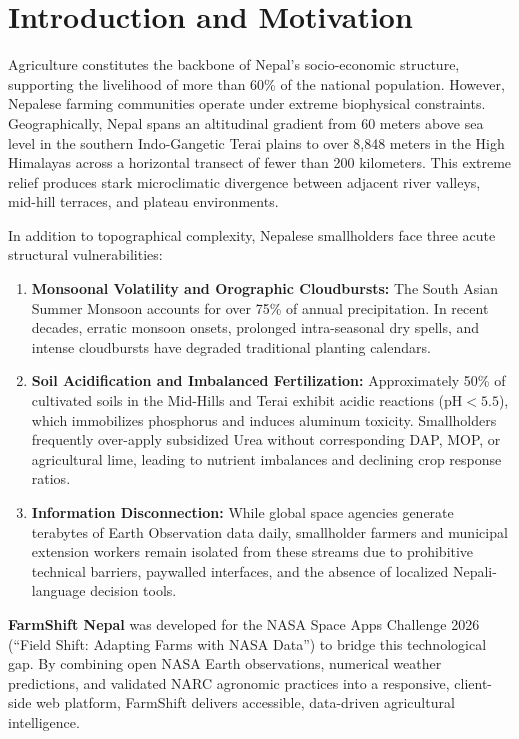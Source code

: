 \documentclass[11pt,a4paper]{report}
\begin{document}
\clearpage
{}

\chapter{Introduction and Motivation}

Agriculture constitutes the backbone of Nepal's socio-economic structure, supporting the livelihood of more than 60\% of the national population. However, Nepalese farming communities operate under extreme biophysical constraints. Geographically, Nepal spans an altitudinal gradient from 60 meters above sea level in the southern Indo-Gangetic Terai plains to over 8,848 meters in the High Himalayas across a horizontal transect of fewer than 200 kilometers. This extreme relief produces stark microclimatic divergence between adjacent river valleys, mid-hill terraces, and plateau environments.

In addition to topographical complexity, Nepalese smallholders face three acute structural vulnerabilities:
\begin{enumerate}
  \item \textbf{Monsoonal Volatility and Orographic Cloudbursts:} The South Asian Summer Monsoon accounts for over 75\% of annual precipitation. In recent decades, erratic monsoon onsets, prolonged intra-seasonal dry spells, and intense cloudbursts have degraded traditional planting calendars.
  \item \textbf{Soil Acidification and Imbalanced Fertilization:} Approximately 50\% of cultivated soils in the Mid-Hills and Terai exhibit acidic reactions ($\text{pH} < 5.5$), which immobilizes phosphorus and induces aluminum toxicity. Smallholders frequently over-apply subsidized Urea without corresponding DAP, MOP, or agricultural lime, leading to nutrient imbalances and declining crop response ratios.
  \item \textbf{Information Disconnection:} While global space agencies generate terabytes of Earth Observation data daily, smallholder farmers and municipal extension workers remain isolated from these streams due to prohibitive technical barriers, paywalled interfaces, and the absence of localized Nepali-language decision tools.
\end{enumerate}

\textbf{FarmShift Nepal} was developed for the NASA Space Apps Challenge 2026 (``Field Shift: Adapting Farms with NASA Data'') to bridge this technological gap. By combining open NASA Earth observations, numerical weather predictions, and validated NARC agronomic practices into a responsive, client-side web platform, FarmShift delivers accessible, data-driven agricultural intelligence.
\end{document}

